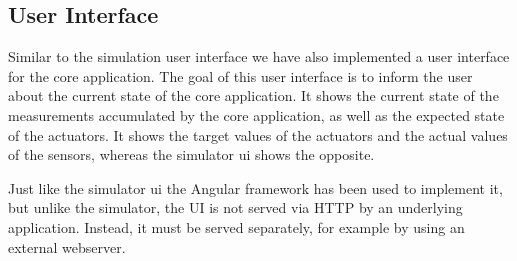 
\subsection{User Interface}\label{subsec:user-interface}

Similar to the simulation user interface we have also implemented a user interface for the core application.
The goal of this user interface is to inform the user about the current state of the core application.
It shows the current state of the measurements accumulated by the core application, as well as the expected state of the actuators.
It shows the target values of the actuators and the actual values of the sensors, whereas the simulator ui shows the opposite.

Just like the simulator ui the Angular framework has been  used to implement it, but unlike the simulator, the UI is not served via HTTP by an underlying application.
Instead, it must be served separately, for example by using an external webserver.